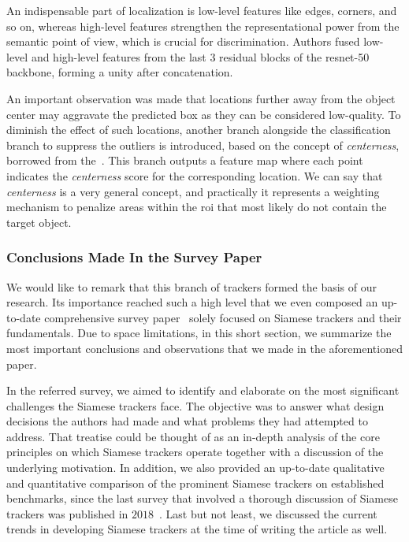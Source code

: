An indispensable part of localization is low-level features like edges, corners, and so on, whereas high-level features strengthen the representational power from the semantic point of view, which is crucial for discrimination. Authors fused low-level and high-level features from the last $3$ residual blocks of the \gls{resnet}-50 backbone, forming a unity after concatenation.

An important observation was made that locations further away from the object center may aggravate the predicted box as they can be considered low-quality. To diminish the effect of such locations, another branch alongside the classification branch to suppress the outliers is introduced, based on the concept of \emph{centerness}, borrowed from the~\cite{tian2019fcos}. This branch outputs a feature map where each point indicates the \emph{centerness} score for the corresponding location. We can say that \emph{centerness} is a very general concept, and practically it represents a weighting mechanism to penalize areas within the \gls{roi} that most likely do not contain the target object.

\subsubsection{Conclusions Made In the Survey Paper}

We would like to remark that this branch of trackers formed the basis of our research. Its importance reached such a high level that we even composed an up-to-date comprehensive survey paper~\cite{ondrasovic2021siamese} solely focused on Siamese trackers and their fundamentals. Due to space limitations, in this short section, we summarize the most important conclusions and observations that we made in the aforementioned paper.

In the referred survey, we aimed to identify and elaborate on the most significant challenges the Siamese trackers face. The objective was to answer what design decisions the authors had made and what problems they had attempted to address. That treatise could be thought of as an in-depth analysis of the core principles on which Siamese trackers operate together with a discussion of the underlying motivation. In addition, we also provided an up-to-date qualitative and quantitative comparison of the prominent Siamese trackers on established benchmarks, since the last survey that involved a thorough discussion of Siamese trackers was published in $2018$~\cite{pflugfelder2018indepth}. Last but not least, we discussed the current trends in developing Siamese trackers at the time of writing the article as well.

